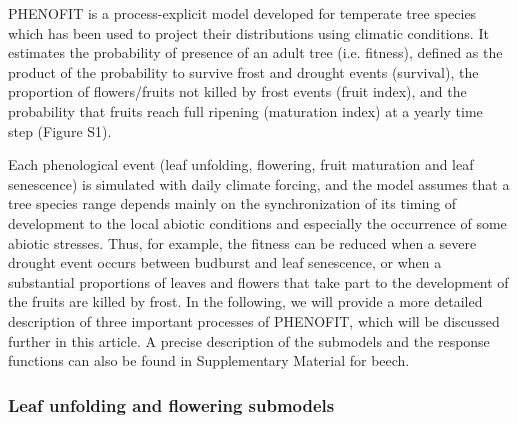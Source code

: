 \documentclass[letterpaper,8pt]{extarticle}  %
\begin{document}
\begin{doublespacing}
\begin{linenumbers}
PHENOFIT is a process-explicit model developed for temperate tree species which has been used to project their distributions using climatic conditions. It estimates the probability of presence of an adult tree (i.e. fitness), defined as the product of the probability to survive frost and drought events (survival), the proportion of flowers/fruits not killed by frost events (fruit index), and the probability that fruits reach full ripening (maturation index) at a yearly time step (Figure S1).

Each phenological event (leaf unfolding, flowering, fruit maturation and leaf senescence) is simulated with daily climate forcing, and the model assumes that a tree species range depends mainly on the synchronization of its timing of development to the local abiotic conditions and especially the occurrence of some abiotic stresses. Thus, for example, the fitness can be reduced when a severe drought event occurs between budburst and leaf senescence, or when a substantial proportions of leaves and flowers that take part to the development of the fruits are killed by frost. In the following, we will provide a more detailed description of three important processes of PHENOFIT, which will be discussed further in this article. A precise description of the submodels and the response functions can also be found in Supplementary Material for beech.

\subsubsection{Leaf unfolding and flowering submodels}


\end{linenumbers}
\end{doublespacing}
\end{document}
